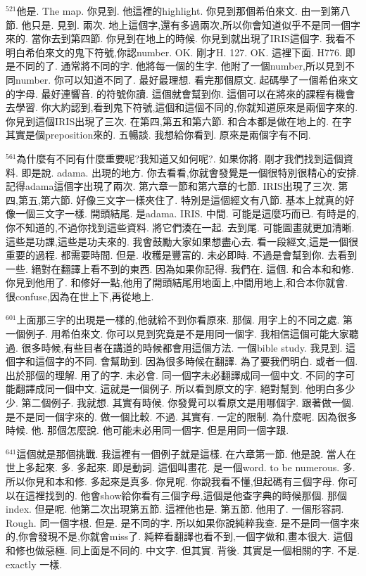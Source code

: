\documentclass{book}
\begin{document}
$^{521}$他是.
The map.
你見到.
他這裡的highlight.
你見到那個希伯來文.
由一到第八節.
他只是.
見到.
兩次.
地上這個字,還有多過兩次,所以你會知道似乎不是同一個字來的.
當你去到第四節.
你見到在地上的時候.
你見到就出現了IRIS這個字.
我看不明白希伯來文的鬼下符號,你認number.
OK.
剛才H.
127.
OK.
這裡下面.
H776.
即是不同的了.
通常將不同的字.
他將每一個的生字.
他附了一個number,所以見到不同number.
你可以知道不同了.
最好最理想.
看完那個原文.
起碼學了一個希伯來文的字母.
最好連響音.
的符號你讀.
這個就會幫到你.
這個可以在將來的課程有機會去學習.
你大約認到,看到鬼下符號,這個和這個不同的,你就知道原來是兩個字來的.
你見到這個IRIS出現了三次.
在第四,第五和第六節.
和合本都是做在地上的.
在字其實是個preposition來的.
五暢談.
我想給你看到.
原來是兩個字有不同.

$^{561}$為什麼有不同有什麼重要呢?我知道又如何呢?.
如果你將.
剛才我們找到這個資料.
即是說.
adama.
出現的地方.
你去看看,你就會發覺是一個很特別很精心的安排.
記得adama這個字出現了兩次.
第六章一節和第六章的七節.
IRIS出現了三次.
第四,第五,第六節.
好像三文字一樣夾住了.
特別是這個經文有八節.
基本上就真的好像一個三文字一樣.
開頭結尾.
是adama.
IRIS.
中間.
可能是這麼巧而已.
有時是的,你不知道的,不過你找到這些資料.
將它們湊在一起.
去到尾.
可能圖畫就更加清晰.
這些是功課,這些是功夫來的.
我會鼓勵大家如果想盡心去.
看一段經文,這是一個很重要的過程.
都需要時間.
但是.
收穫是豐富的.
未必即時.
不過是會幫到你.
去看到一些.
絕對在翻譯上看不到的東西.
因為如果你記得.
我們在.
這個.
和合本和和修.
你見到他用了.
和修好一點,他用了開頭結尾用地面上,中間用地上,和合本你就會.
很confuse,因為在世上下,再從地上.

$^{601}$上面那三字的出現是一樣的,他就給不到你看原來.
那個.
用字上的不同之處.
第一個例子.
用希伯來文.
你可以見到究竟是不是用同一個字.
我相信這個可能大家聽過.
很多時候,有些目者在講道的時候都會用這個方法.
一個bible study.
我見到.
這個字和這個字的不同.
會幫助到.
因為很多時候在翻譯.
為了要我們明白.
或者一個.
出於那個的理解.
用了的字.
未必會.
同一個字未必翻譯成同一個中文.
不同的字可能翻譯成同一個中文.
這就是一個例子.
所以看到原文的字.
絕對幫到.
他明白多少少.
第二個例子.
我就想.
其實有時候.
你發覺可以看原文是用哪個字.
跟著做一個.
是不是同一個字來的.
做一個比較.
不過.
其實有.
一定的限制.
為什麼呢.
因為很多時候.
他.
那個怎麼說.
他可能未必用同一個字.
但是用同一個字跟.

$^{641}$這個就是那個挑戰.
我這裡有一個例子就是這樣.
在六章第一節.
他是說.
當人在世上多起來.
多.
多起來.
即是動詞.
這個叫畫花.
是一個word.
to be numerous.
多.
所以你見和本和修.
多起來是真多.
你見呢.
你說我看不懂,但起碼有三個字母.
你可以在這裡找到的.
他會show給你看有三個字母,這個是他查字典的時候那個.
那個index.
但是呢.
他第二次出現第五節.
這裡他也是.
第五節.
他用了.
一個形容詞.
Rough.
同一個字根.
但是.
是不同的字.
所以如果你說純粹我查.
是不是同一個字來的,你會發現不是,你就會miss了.
純粹看翻譯也看不到,一個字做和,畫本很大.
這個和修也做惡極.
同上面是不同的.
中文字.
但其實.
背後.
其實是一個相關的字.
不是.
exactly 一樣.
\end{document}
